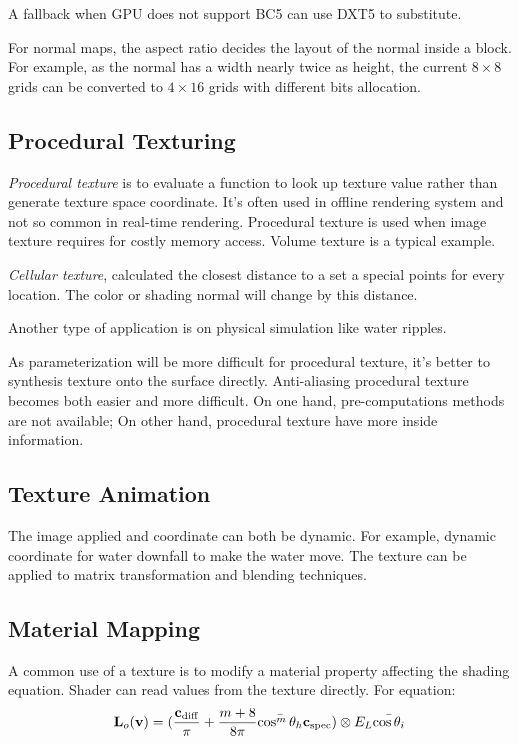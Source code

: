 \documentclass[10pt, a4paper]{article}
\begin{document}
    A fallback when GPU does not support BC5 can use DXT5 to substitute. 

    For normal maps, the aspect ratio decides the layout of the normal inside a block. For example, as the normal has a width nearly twice as height, the current $8 \times 8$ grids can be converted to $4 \times 16$ grids with different bits allocation. 

\subsection{Procedural Texturing}
\emph{Procedural texture} is to evaluate a function to look up texture value rather than generate texture space coordinate. It's often used in offline rendering system and not so common in real-time rendering. Procedural texture is used when image texture requires for costly memory access. Volume texture is a typical example. 

\emph{Cellular texture}, calculated the closest distance to a set a special points for every location. The color or shading normal will change by this distance. 

Another type of application is on physical simulation like water ripples. 

As parameterization will be more difficult for procedural texture, it's better to synthesis texture onto the surface directly. Anti-aliasing procedural texture becomes both easier and more difficult. On one hand, pre-computations methods are not available; On other hand, procedural texture have more inside information. 

\subsection{Texture Animation}  
The image applied and coordinate can both be dynamic. For example, dynamic coordinate for water downfall to make the water move. The texture can be applied to matrix transformation and blending techniques. 

\subsection{Material Mapping}
A common use of a texture is to modify a material property affecting the shading equation. Shader can read values from the texture directly. For equation:
$$\textbf{L}_o(\textbf{v}) = (\frac{\textbf{c}_{\rm{diff}}}{\pi} + \frac{m + 8}{8\pi}\bar{\cos^m{\theta_h}}\textbf{c}_{\rm{spec}}) \otimes E_L\bar{\cos{\theta_i}}$$
\end{document}
